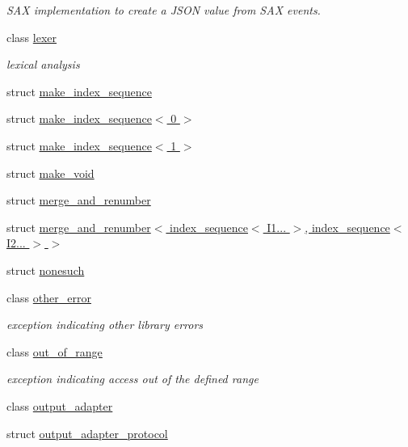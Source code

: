 \begin{DoxyCompactItemize}
\begin{DoxyCompactList}\small\item\em S\+AX implementation to create a J\+S\+ON value from S\+AX events. \end{DoxyCompactList}\item 
class \hyperlink{classnlohmann_1_1detail_1_1lexer}{lexer}
\begin{DoxyCompactList}\small\item\em lexical analysis \end{DoxyCompactList}\item 
struct \hyperlink{structnlohmann_1_1detail_1_1make__index__sequence}{make\+\_\+index\+\_\+sequence}
\item 
struct \hyperlink{structnlohmann_1_1detail_1_1make__index__sequence_3_010_01_4}{make\+\_\+index\+\_\+sequence$<$ 0 $>$}
\item 
struct \hyperlink{structnlohmann_1_1detail_1_1make__index__sequence_3_011_01_4}{make\+\_\+index\+\_\+sequence$<$ 1 $>$}
\item 
struct \hyperlink{structnlohmann_1_1detail_1_1make__void}{make\+\_\+void}
\item 
struct \hyperlink{structnlohmann_1_1detail_1_1merge__and__renumber}{merge\+\_\+and\+\_\+renumber}
\item 
struct \hyperlink{structnlohmann_1_1detail_1_1merge__and__renumber_3_01index__sequence_3_01_i1_8_8_8_01_4_00_01indf5ec8c9c7b5107e4b381e3ca4c1be2ca}{merge\+\_\+and\+\_\+renumber$<$ index\+\_\+sequence$<$ I1... $>$, index\+\_\+sequence$<$ I2... $>$ $>$}
\item 
struct \hyperlink{structnlohmann_1_1detail_1_1nonesuch}{nonesuch}
\item 
class \hyperlink{classnlohmann_1_1detail_1_1other__error}{other\+\_\+error}
\begin{DoxyCompactList}\small\item\em exception indicating other library errors \end{DoxyCompactList}\item 
class \hyperlink{classnlohmann_1_1detail_1_1out__of__range}{out\+\_\+of\+\_\+range}
\begin{DoxyCompactList}\small\item\em exception indicating access out of the defined range \end{DoxyCompactList}\item 
class \hyperlink{classnlohmann_1_1detail_1_1output__adapter}{output\+\_\+adapter}
\item 
struct \hyperlink{structnlohmann_1_1detail_1_1output__adapter__protocol}{output\+\_\+adapter\+\_\+protocol}

\end{DoxyCompactItemize}
